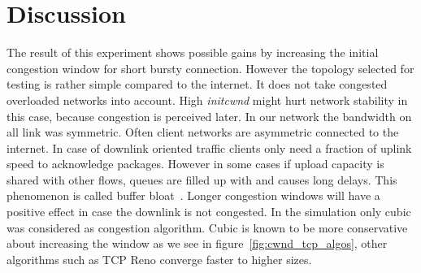 \section{Discussion}
\label{sec:discussion}

The result of this experiment shows possible gains by increasing the initial
congestion window for short bursty connection. However the topology selected for
testing is rather simple compared to the internet. It does not take congested
overloaded networks into account. High \emph{initcwnd} might hurt network
stability in this case, because congestion is perceived later. In our network
the bandwidth on all link was symmetric. Often client networks are asymmetric
connected to the internet. In case of downlink oriented traffic clients only
need a fraction of uplink speed to acknowledge packages. However in some cases
if upload capacity is shared with other flows, queues are filled up with and
causes long delays. This phenomenon is called buffer bloat~\cite{rfc970}. Longer
congestion windows will have a positive effect in case the downlink is not
congested. In the simulation only cubic was considered as congestion algorithm.
Cubic is known to be more conservative about increasing the window as we see in
figure~\ref{fig:cwnd_tcp_algos}, other algorithms such as TCP Reno converge
faster to higher sizes.
